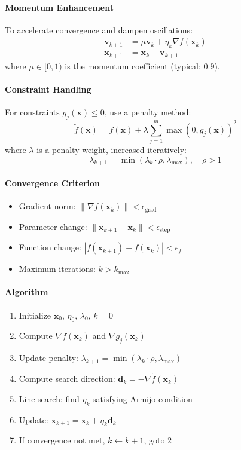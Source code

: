 \documentclass{report}
\begin{document}
\paragraph{Momentum Enhancement}
To accelerate convergence and dampen oscillations:
\begin{align}
\mathbf{v}_{k+1} &= \mu \mathbf{v}_k + \eta_k \nabla f(\mathbf{x}_k) \\
\mathbf{x}_{k+1} &= \mathbf{x}_k - \mathbf{v}_{k+1}
\end{align}
where $\mu \in [0, 1)$ is the momentum coefficient (typical: $0.9$).

\paragraph{Constraint Handling}
For constraints $g_j(\mathbf{x}) \leq 0$, use a penalty method:
\begin{equation}
\tilde{f}(\mathbf{x}) = f(\mathbf{x}) + \lambda \sum_{j=1}^{m} \max(0, g_j(\mathbf{x}))^2
\end{equation}
where $\lambda$ is a penalty weight, increased iteratively:
\begin{equation}
\lambda_{k+1} = \min(\lambda_k \cdot \rho, \lambda_{\max}), \quad \rho > 1
\end{equation}

\paragraph{Convergence Criterion}
\begin{itemize}
\item Gradient norm: $\|\nabla f(\mathbf{x}_k)\| < \epsilon_{\text{grad}}$
\item Parameter change: $\|\mathbf{x}_{k+1} - \mathbf{x}_k\| < \epsilon_{\text{step}}$
\item Function change: $|f(\mathbf{x}_{k+1}) - f(\mathbf{x}_k)| < \epsilon_f$
\item Maximum iterations: $k > k_{\max}$
\end{itemize}

\paragraph{Algorithm}
\begin{enumerate}
\item Initialize $\mathbf{x}_0$, $\eta_0$, $\lambda_0$, $k = 0$
\item Compute $\nabla f(\mathbf{x}_k)$ and $\nabla g_j(\mathbf{x}_k)$
\item Update penalty: $\lambda_{k+1} = \min(\lambda_k \cdot \rho, \lambda_{\max})$
\item Compute search direction: $\mathbf{d}_k = -\nabla \tilde{f}(\mathbf{x}_k)$
\item Line search: find $\eta_k$ satisfying Armijo condition
\item Update: $\mathbf{x}_{k+1} = \mathbf{x}_k + \eta_k \mathbf{d}_k$
\item If convergence not met, $k \leftarrow k+1$, goto 2
\end{enumerate}
\end{document}
